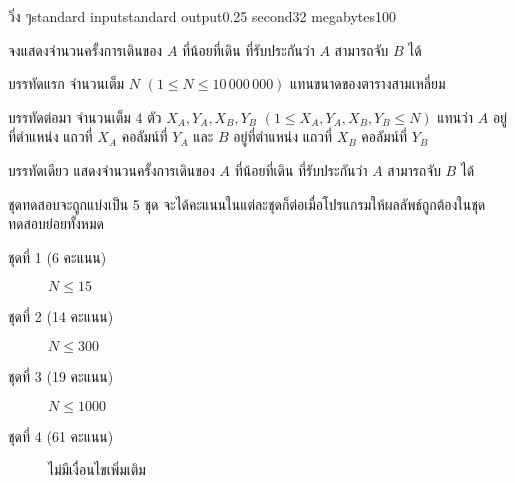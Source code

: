 \documentclass[11pt,a4paper]{article}
\begin{document}
\begin{problem}{วิ่ง ๆ}{standard input}{standard output}{0.25 second}{32 megabytes}{100}
\YourWork

จงแสดงจำนวนครั้งการเดินของ $A$ ที่น้อยที่เดิน ที่รับประกันว่า $A$ สามารถจับ $B$ ได้

\InputFile
 
บรรทัดแรก จำนวนเต็ม $N$ $(1 \leq N \leq 10\,000\,000)$ แทนขนาดของตารางสามเหลี่ยม

บรรทัดต่อมา จำนวนเต็ม $4$ ตัว $X_A, Y_A, X_B, Y_B$ $(1 \leq X_A, Y_A, X_B, Y_B \leq N)$ แทนว่า $A$ อยู่ที่ตำแหน่ง แถวที่ $X_A$ คอลัมน์ที่ $Y_A$ และ $B$ อยู่ที่ตำแหน่ง แถวที่ $X_B$ คอลัมน์ที่ $Y_B$
 
\OutputFile

บรรทัดเดียว แสดงจำนวนครั้งการเดินของ $A$ ที่น้อยที่เดิน ที่รับประกันว่า $A$ สามารถจับ $B$ ได้
 
\Scoring
ชุดทดสอบจะถูกแบ่งเป็น 5 ชุด จะได้คะแนนในแต่ละชุดก็ต่อเมื่อโปรแกรมให้ผลลัพธ์ถูกต้องในชุดทดสอบย่อยทั้งหมด
 
\begin{description}
\item[ชุดที่ 1 (6 คะแนน)] $N \leq 15$
\item[ชุดที่ 2 (14 คะแนน)] $N \leq 300$
\item[ชุดที่ 3 (19 คะแนน)] $N \leq 1000$
\item[ชุดที่ 4 (61 คะแนน)] ไม่มีเงื่อนไขเพิ่มเติม
\end{description}
\Examples

\begin{example}
%
%
\end{example}
 
\end{problem}
 
\end{document}
